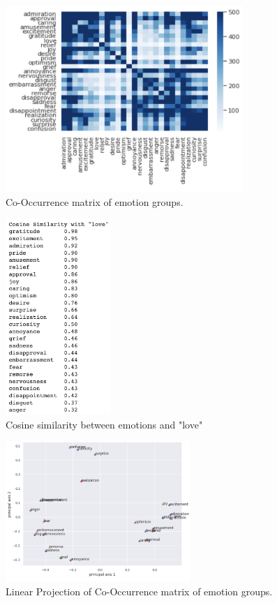 \documentclass[conference]{IEEEtran}
\begin{document}
\begin{figure}[htbp]
\centerline{\includegraphics[width=9cm, keepaspectratio,]{fig/cooc-heatmap.png}}
\caption{Co-Occurrence matrix of emotion groups.}
\label{fig}
\end{figure}

\begin{figure}[htbp]
\centerline{\includegraphics[width=4cm, keepaspectratio,]{fig/love_cosine_sim.png}}
\caption{Cosine similarity between emotions and "love"}
\label{fig}
\end{figure}

\begin{figure}[htbp]
\centerline{\includegraphics[width=7cm, keepaspectratio,]{fig/covariance-pca.png} }
\caption{Linear Projection of Co-Occurrence matrix of emotion groups.}
\label{fig}
\end{figure}
\end{document}
